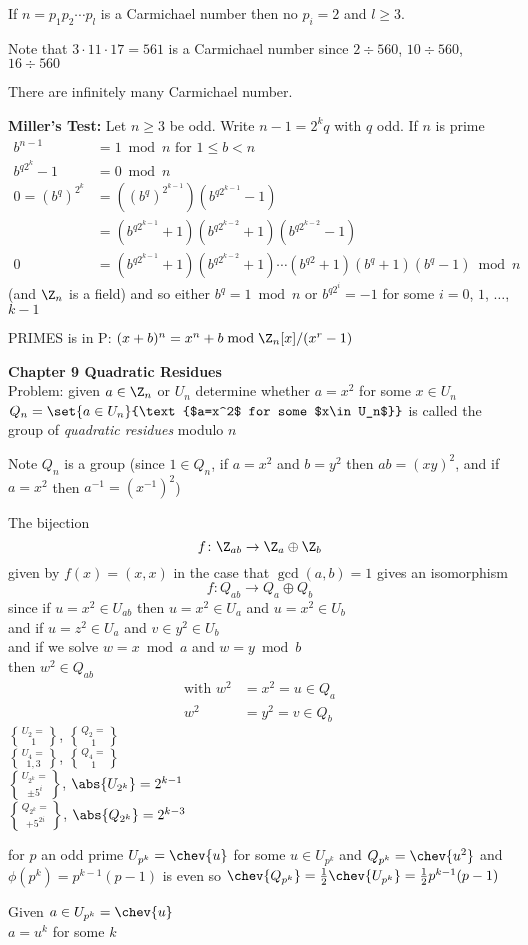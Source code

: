 \ex If $n=p_1p_2\dotsm p_l$ is a Carmichael number then no $p_i=2$ and $l\geq3$.

\eg Note that $3\cdot11\cdot17=561$ is a Carmichael number since $2\div560$, $10\div560$, $16\div560$

\remark There are infinitely many Carmichael number.

\textbf{Miller's Test:} Let $n\geq3$ be odd.  Write $n-1=2^kq$ with $q$ odd.  If $n$ is prime
\begin{align*}
b^{n-1} &= 1 \bmod n \text{ for $1\leq b<n$} \\
b^{q2^k}-1 &= 0 \bmod n \\
0 = (b^q)^{2^k} &= ((b^q)^{2^{k-1}})(b^{q2^{k-1}}-1) \\
&= (b^{q2^{k-1}}+1)(b^{q2^{k-2}}+1)(b^{q2^{k-2}}-1) \\
0 &= (b^{q2^{k-1}}+1)(b^{q2^{k-2}}+1)\dotsm(b^{q2}+1)(b^q+1)(b^q-1) \bmod n
\end{align*}
(and $\Z_n$ is a field) and so either $b^q=1\bmod n$ or $b^{q2^i}=-1$ for some $i=0$, $1$, $\dotsc$, $k-1$

PRIMES is in P: $(x+b)^n=x^n+b\bmod\Z_n[x]/(x^r-1)$

\textbf{Chapter 9 Quadratic Residues} \\
Problem: given $a\in\Z_n$ or $U_n$ determine whether $a=x^2$ for some $x\in U_n$ \\
 $Q_n=\set{a\in U_n}{\text{$a=x^2$ for some $x\in U_n$}}$ is called the group of \emph{quadratic residues} modulo $n$

Note $Q_n$ is a group (since $1\in Q_n$, if $a=x^2$ and $b=y^2$ then $ab=(xy)^2$, and if $a=x^2$ then $a^{-1}=(x^{-1})^2$)

\note The bijection
\[ f\colon \Z_{ab} \to \Z_a \oplus \Z_b \]
given by $f(x)=(x,x)$ in the case that $\gcd(a,b)=1$ gives an isomorphism
\[ f\colon Q_{ab} \to Q_a \oplus Q_b \]
since if $u=x^2\in U_{ab}$ then $u=x^2\in U_a$ and $u=x^2\in U_b$ \\
and if $u=z^2\in U_a$ and $v\in y^2\in U_b$ \\
and if we solve $w=x\bmod a$ and $w=y\bmod b$ \\
then $w^2\in Q_{ab}$
\begin{align*}
\text{with } w^2 &= x^2 = u \in Q_a \\
w^2 &= y^2 = v \in Q_b
\end{align*}
\note $U_2=\brace1$, $Q_2=\brace1$ \\
$U_4=\brace{1,3}$, $Q_4=\brace{1}$ \\
$U_{2^k}=\brace{\pm5^i}$, $\abs{U_{2^k}}=2^{k-1}$ \\
$Q_{2^k}=\brace{+5^{2i}}$, $\abs{Q_{2^k}}=2^{k-3}$

for $p$ an odd prime $U_{p^k}=\chev{u}$ for some $u\in U_{p^k}$ and $Q_{p^k}=\chev{u^2}$ and $\phi(p^k)=p^{k-1}(p-1)$ is even so $\chev{Q_{p^k}}=\frac12\chev{U_{p^k}}=\frac12 p^{k-1}(p-1)$

Given $a\in U_{p^k}=\chev{u}$ \\
$a=u^k$ for some $k$
